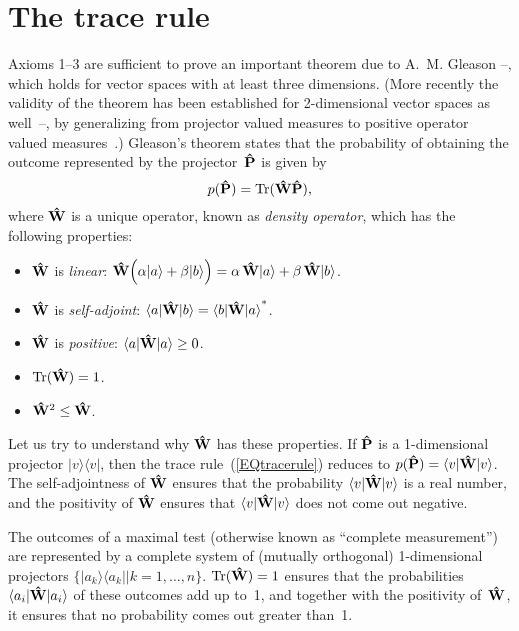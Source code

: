\documentclass[12pt]{article}
\newcommand{\ket}[1]{\vert#1\rangle}
\newcommand{\ketbra}[2]{\vert#1\rangle\langle#2\vert}
\newcommand{\sandwich}[3]{\langle#1\vert#2\vert#3\rangle}
\newcommand{\Tr}{\hbox{Tr}}
\newcommand{\be}{\begin{equation}}
\newcommand{\ee}{\end{equation}}
\newcommand{\bi}{\begin{itemize}}
\newcommand{\ei}{\end{itemize}}
\newcommand{\cV}{{\cal V}}
\newcommand{\hA}{{\bf\hat A}}
\newcommand{\hP}{{\bf\hat P}}
\newcommand{\hW}{{\bf\hat W}}
\begin{document}
\section{The trace rule}
Axioms 1--3 are sufficient \cite{Peres190} to prove an important theorem due to A.~M. Gleason \cite{Gleason}--\cite{Cookeetal}, which holds for vector spaces with at least three dimensions. (More recently the validity of the theorem has been established for 2-dimensional vector spaces as well~\cite{Fuchs2001}--\cite{Cavesetal}, by generalizing from projector valued measures to positive operator valued measures~\cite{Peres9-5}.)
Gleason's theorem states that the probability of obtaining the outcome represented by the projector~$\hP$ is given by
\be
p(\hP)=\Tr(\hW\hP),
\label{EQtracerule}
\ee
where $\hW$ is a unique operator, known as {\it density operator\/}, which has the following properties: 
\bi
\item $\hW$ is \textit{linear}: $\hW\Bigl(\alpha\ket a+\beta\ket b\Bigr)=\alpha\,\hW\ket a+ \beta\,\hW\ket b$.
\item $\hW$ is \textit{self-adjoint}: $\sandwich a\hW b={\sandwich b\hW a}^*$.
\item $\hW$ is \textit{positive}: $\sandwich a\hW a\geq0$. 
\item $\Tr(\hW)=1$.
\item $\hW^2\leq\hW$.
\ei
Let us try to understand why $\hW$ has these properties.  If $\hP$ is a 1-dimensional projector $\ketbra vv$, then the trace rule~(\ref{EQtracerule}) reduces to $p(\hP)=\sandwich v\hW v$. The self-adjointness of $\hW$ ensures that the probability $\sandwich v\hW v$ is a real number, and the positivity of $\hW$ ensures that $\sandwich v\hW v$ does not come out negative.

The outcomes of a maximal test (otherwise known as ``complete measurement'') are represented by a complete system of (mutually orthogonal) 1-dimensional projectors $\{\ketbra{a_k}{a_k}|k=1,\dots,n\}$. $\Tr(\hW)=1$ ensures that the probabilities $\sandwich{a_i}\hW{a_i}$ of these outcomes add up to~1, and together with the positivity of~$\hW$, it ensures that no probability comes out greater than~1.
\end{document}
